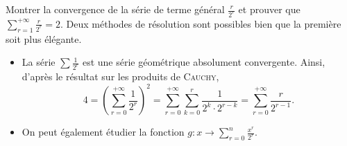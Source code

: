 Montrer la convergence de la série de terme général $\frac{r}{2^r}$ et prouver que $\sum\limits_{r=1}^{+ \infty} \frac{r}{2^r} = 2$. Deux méthodes de résolution sont possibles bien que la première soit plus élégante. 

\begin{itemize}
    \item La série $\sum \frac{1}{2^r}$ est une série géométrique absolument convergente. Ainsi, d'après le résultat sur les produits de \textsc{Cauchy}, 
    $$4 = \left( \sum_{r=0}^{+ \infty} \frac{1}{2^r} \right)^2 = \sum_{r=0}^{+ \infty} \sum_{k=0}^{r} \frac{1}{2^k \cdot 2^{r-k}} = \sum_{r=0}^{+ \infty} \frac{r}{2^{r-1}}.$$
    \item On peut également étudier la fonction $g : x \to \sum\limits_{r=0}^{n} \frac{x^r}{2^r}$.
\end{itemize}